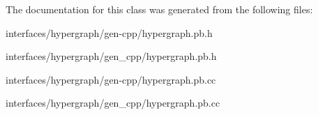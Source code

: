 The documentation for this class was generated from the following files:\begin{DoxyCompactItemize}
\item 
interfaces/hypergraph/gen-\/cpp/hypergraph.pb.h\item 
interfaces/hypergraph/gen\_\-cpp/hypergraph.pb.h\item 
interfaces/hypergraph/gen-\/cpp/hypergraph.pb.cc\item 
interfaces/hypergraph/gen\_\-cpp/hypergraph.pb.cc\end{DoxyCompactItemize}
